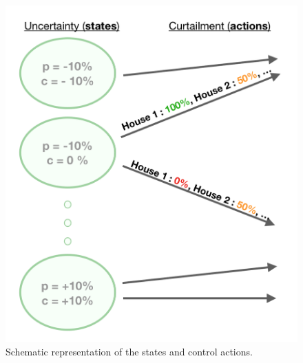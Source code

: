 \begin{figure}
  \begin{center}
    \includegraphics[scale=0.43]{./img/model_diagram.png}
  \end{center}
  \caption{Schematic representation of the states and control actions.}
  \label{fig:model_diag}
\end{figure}
